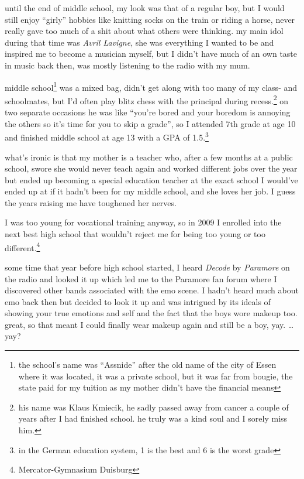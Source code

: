 \documentclass[12pt]{report}
\theoremstyle{definition}
\theoremstyle{remark}
\begin{document}
until the end of middle school, my look was that of a regular boy, but I would still enjoy ``girly'' hobbies like knitting socks on the train or riding a horse, never really gave too much of a shit about what others were thinking. my main idol during that time was \emph{Avril Lavigne}, she was everything I wanted to be and inspired me to become a musician myself, but I didn't have much of an own taste in music back then, was mostly listening to the radio with my mum.

middle school\footnote{the school's name was ``Assnide'' after the old name of the city of Essen where it was located, it was a private school, but it was far from bougie, the state paid for my tuition as my mother didn't have the financial means} was a mixed bag, didn't get along with too many of my class- and schoolmates, but I'd often play blitz chess with the principal during recess.\footnote{his name was Klaus Kmiecik, he sadly passed away from cancer a couple of years after I had finished school. he truly was a kind soul and I sorely miss him.} on two separate occasions he was like ``you're bored and your boredom is annoying the others so it's time for you to skip a grade'', so I attended 7th grade at age 10 and finished middle school at age 13 with a GPA of 1.5.\footnote{in the German education system, 1 is the best and 6 is the worst grade}

what's ironic is that my mother is a teacher who, after a few months at a public school, swore she would never teach again and worked different jobs over the year but ended up becoming a special education teacher at the exact school I would've ended up at if it hadn't been for my middle school, and she loves her job. I guess the years raising me have toughened her nerves.

I was too young for vocational training anyway, so in 2009 I enrolled into the next best high school that wouldn't reject me for being too young or too different.\footnote{Mercator-Gymnasium Duisburg}

some time that year before high school started, I heard \emph{Decode} by \emph{Paramore} on the radio and looked it up which led me to the Paramore fan forum where I discovered other bands associated with the emo scene. I hadn't heard much about emo back then but decided to look it up and was intrigued by its ideals of showing your true emotions and self and the fact that the boys wore makeup too. great, so that meant I could finally wear makeup again and still be a boy, yay. …yay?
\end{document}
